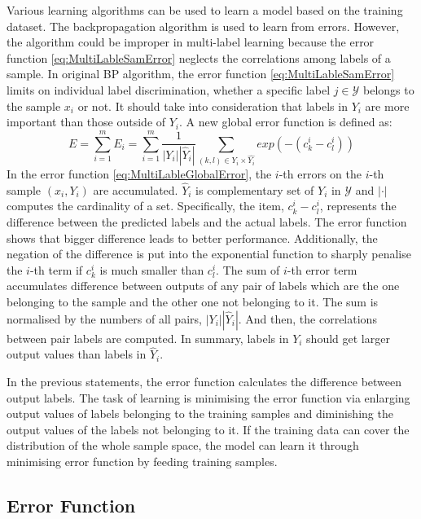 Various learning algorithms can be used to learn a model based on the training dataset. The backpropagation algorithm is used to learn from errors. However, the algorithm could be improper in multi-label learning because the error function \ref{eq:MultiLableSamError} neglects the correlations among labels of a sample. In original BP algorithm, the error function \ref{eq:MultiLableSamError} limits on individual label discrimination, whether a specific label $j \in \mathcal{Y}$ belongs to the sample $x_{i}$ or not. It should take into consideration that labels in $Y_{i}$ are more important than those outside of $Y_{i}$. A new global error function is defined as:
\begin{equation}\label{eq:MultiLableGlobalError}
E = \sum_{i=1}^m E_{i} = \sum_{i=1}^m \frac{1}{|Y_{i}||\hat{Y}_{i}|} \sum_{(k,l) \in Y_{i} \times \hat{Y_{i}}} exp(-(c_{k}^i-c_{l}^i))
\end{equation}
In the error function \ref{eq:MultiLableGlobalError}, the $i$-th errors on the $i$-th sample $(x_{i},Y_{i})$ are accumulated. $\hat{Y}_{i}$ is complementary set of $Y_{i}$ in $\mathcal{Y}$ and $|\cdot|$ computes the cardinality of a set. Specifically, the item, $c_{k}^i-c_{l}^i$, represents the difference between the predicted labels and the actual labels. The error function shows that bigger difference leads to better performance. Additionally, the negation of the difference is put into the exponential function to sharply penalise the $i$-th term if $c_{k}^i$ is much smaller than $c_{l}^i$. The sum of $i$-th error term accumulates difference between outputs of any pair of labels which are the one belonging to the sample and the other one not belonging to it. The sum is normalised by the numbers of all pairs, $|Y_{i}||\hat{Y}_{i}|$. And then, the correlations between pair labels are computed. In summary, labels in $Y_{i}$ should get larger output values than labels in $\hat{Y}_{i}$.

In the previous statements, the error function calculates the difference between output labels. The task of learning is minimising the error function via enlarging output values of labels belonging to the training samples and diminishing the output values of the labels not belonging to it. If the training data can cover the distribution of the whole sample space, the model can learn it through minimising error function by feeding training samples.

\subsection{Error Function}

